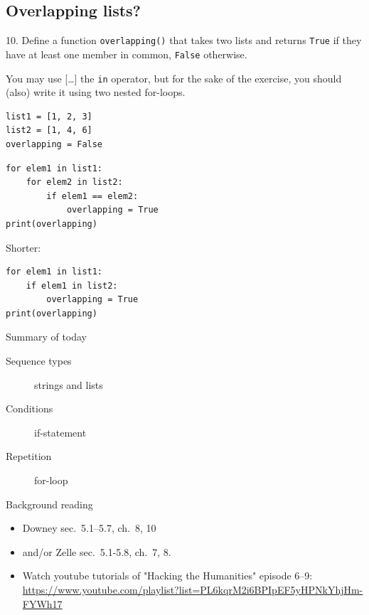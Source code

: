 \documentclass[aspectratio=169,usenames,dvipsnames]{beamer}
\begin{document}
\subsection{Overlapping lists?}
\begin{frame}[fragile]
10. Define a function \texttt{overlapping()} that takes two lists and returns
    \texttt{True} if they have at least one member in common, \texttt{False}
    otherwise.

    \vspace{1em}
    You may use [\dots] the \texttt{in} operator, but for the sake of the
    exercise, you should (also) write it using two nested for-loops.
\begin{lstlisting}
list1 = [1, 2, 3]
list2 = [1, 4, 6]
overlapping = False
\end{lstlisting}
\pause
\begin{lstlisting}
for elem1 in list1:
    for elem2 in list2:
        if elem1 == elem2:
            overlapping = True
print(overlapping)
\end{lstlisting}
\pause
Shorter:
\begin{lstlisting}
for elem1 in list1:
    if elem1 in list2:
        overlapping = True
print(overlapping)
\end{lstlisting}
\end{frame}

\begin{frame}{Summary of today}
    \begin{description}
        \item[Sequence types] strings and lists
        \item[Conditions] if-statement
        \item[Repetition] for-loop
    \end{description}
\end{frame}


\begin{frame}{Background reading}
    \begin{itemize}
        \item Downey sec.\ 5.1--5.7, ch.\ 8, 10
        \item and/or Zelle sec.\ 5.1-5.8, ch.\ 7, 8.
        \item Watch youtube tutorials of "Hacking the Humanities" episode 6--9:
            {\small \url{https://www.youtube.com/playlist?list=PL6kqrM2i6BPIpEF5yHPNkYhjHm-FYWh17}}
    \end{itemize}
\end{frame}
\end{document}
